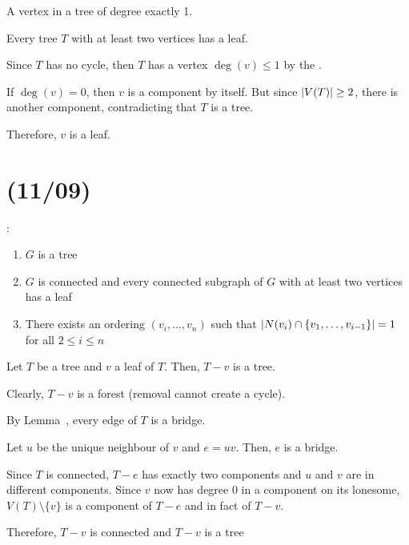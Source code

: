 \documentclass[class=math239,notes,tikz]{agony}
\begin{document}
\begin{defn}[leaf]
  A vertex in a tree of degree exactly 1.
\end{defn}

\begin{theorem}\label{thm:leafexist}
  Every tree $T$ with at least two vertices has a leaf.
\end{theorem}
\begin{sol}
  Since $T$ has no cycle, then $T$ has a vertex $\deg(v) \leq 1$ by
  the .

  If $\deg(v) = 0$, then $v$ is a component by itself.
  But since $\abs{V(T)} \geq 2$, there is another component,
  contradicting that $T$ is a tree.

  Therefore, $v$ is a leaf.
\end{sol}

\section{(11/09)}

\begin{theorem}
  \TFAE:
  \begin{enumerate}[(1),nosep]
    \item $G$ is a tree
    \item $G$ is connected and every connected subgraph of $G$
          with at least two vertices has a leaf
    \item There exists an ordering $(v_i,\dotsc,v_n)$ such that
          $\abs{N(v_i) \cap \{v_1,\dotsc,v_{i-1}\}} = 1$ for all $2 \leq i \leq n$
  \end{enumerate}
\end{theorem}

\begin{theorem}\label{thm:leafremove}
  Let $T$ be a tree and $v$ a leaf of $T$.
  Then, $T-v$ is a tree.
\end{theorem}
\begin{prf}
  Clearly, $T-v$ is a forest (removal cannot create a cycle).

  By Lemma~, every edge of $T$ is a bridge.

  Let $u$ be the unique neighbour of $v$ and $e=uv$.
  Then, $e$ is a bridge.

  Since $T$ is connected, $T-e$ has exactly two components
  and $u$ and $v$ are in different components.
  Since $v$ now has degree 0 in a component on its lonesome,
  $V(T) \setminus \{v\}$ is a component of $T-e$ and in fact of $T-v$.

  Therefore, $T-v$ is connected and $T-v$ is a tree
\end{prf}
\end{document}

